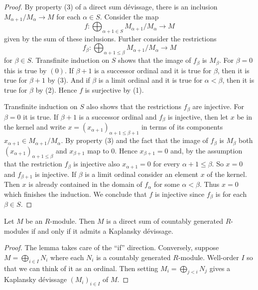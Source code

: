\begin{proof}
By property (3) of a direct sum d\'evissage, there is an inclusion
$M_{\alpha + 1}/M_{\alpha} \to M$ for each $\alpha \in S$.  Consider the
map
$$
f : \bigoplus\nolimits_{\alpha + 1\in S} M_{\alpha + 1}/M_{\alpha} \to M
$$
given by the sum of these inclusions.
Further consider the restrictions
$$
f_{\beta} :
\bigoplus\nolimits_{\alpha + 1 \leq \beta} M_{\alpha + 1}/M_{\alpha}
\longrightarrow
M
$$
for $\beta\in S$. Transfinite induction on $S$ shows that the image of
$f_{\beta}$ is $M_{\beta}$. For $\beta=0$ this is true by $(0)$. If $\beta+1$
is a successor ordinal and it is true for $\beta$, then it is true for 
$\beta + 1$ by (3).  And if $\beta$ is a limit ordinal and it is true for
$\alpha < \beta$, then it is true for $\beta$ by (2). Hence $f$ is surjective
by (1).  

\medskip\noindent
Transfinite induction on $S$ also shows that the restrictions $f_{\beta}$
are injective. For $\beta = 0$ it is true. If $\beta+1$ is a
successor ordinal and $f_{\beta}$ is injective, then let $x$ be in the kernel
and write $x = (x_{\alpha + 1})_{\alpha + 1 \leq \beta + 1}$ in terms of its
components $x_{\alpha + 1} \in M_{\alpha + 1}/M_{\alpha}$.  By property (3) and
the fact that the image of $f_{\beta}$ is $M_{\beta}$ both
$(x_{\alpha + 1})_{\alpha + 1 \leq \beta}$ and $x_{\beta + 1}$ map to $0$.
Hence $x_{\beta+1} = 0$ and, by the assumption that the restriction
$f_{\beta}$ is injective also $x_{\alpha + 1} = 0$
for every $\alpha + 1 \leq \beta$.  So $x = 0$ and $f_{\beta+1}$ is injective.
If $\beta$ is a limit ordinal consider an element $x$ of the kernel. Then $x$
is already contained in the domain of $f_{\alpha}$ for some $\alpha < \beta$.
Thus $x = 0$ which finishes the induction.
We conclude that $f$ is injective since $f_{\beta}$ is for each $\beta \in S$.
\end{proof}

\begin{lemma}
\label{lemma-Kaplansky-devissage}
Let $M$ be an $R$-module.  Then $M$ is a direct sum of countably generated
$R$-modules if and only if it admits a Kaplansky d\'evissage.
\end{lemma}

\begin{proof}
The lemma takes care of the ``if'' direction.  Conversely, suppose $M =
\bigoplus_{i \in I} N_i$ where each $N_i$ is a countably generated $R$-module.
Well-order $I$ so that we can think of it as an ordinal.  Then setting $M_i =
\bigoplus_{j < i} N_j$ gives a Kaplansky d\'evissage $(M_i)_{i \in I}$ of
$M$.
\end{proof}

